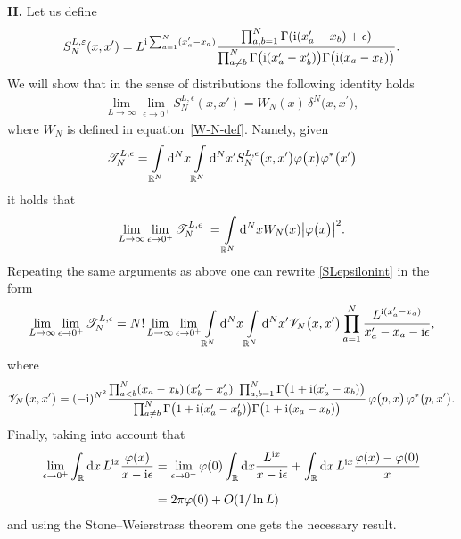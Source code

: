 \noindent
{\bf II.} Let us define
\begin{gather*}
S_N^{L,\varepsilon}(x,x')=L^{{\rm i}\sum_{a=1}^{N}(x'_a-x_a)}\frac{\prod_{a,b=1}^{N} \Gamma({\rm i}(x'_a-x_b)+\epsilon)}{\prod_{ a \not= b }^{ N }
\Gamma\big({\rm i} (x_{a}^{\prime}-x_{b}^{\prime}) \big) \Gamma\big({\rm i} (x_{a}-x_{b}) \big)}.
\end{gather*}
We will show that in the sense of distributions the following identity holds
\begin{gather*}
\lim_{L\rightarrow\infty}\lim_{\epsilon\rightarrow 0^+}S_N^{L,\epsilon}(x,x')
 =W_N(x) \, \delta^{N}\big(x,x^{\prime} \big),
\end{gather*}
where $W_N$ is defined in equation~\eqref{W-N-def}. Namely, given
\begin{gather}
\mathscr{T}_N^{L,\epsilon} = \int\limits_{\mathbb{R}^{N}}{\rm d}^{N}x
\int\limits_{\mathbb{R}^{N}}{} {\rm d}^{N}x^{\prime}
{S}_N^{L,\epsilon}\big(x,x^{\prime} \big)
\varphi\big(x\big)\varphi^{*}\big(x^{\prime}\big)
\label{SLepsilonint}
\end{gather}
it holds that
\begin{gather*}
\lim_{L\rightarrow\infty}\lim_{\epsilon \rightarrow 0^+ } \mathscr{T}_N^{L,\epsilon}   =
 \int\limits_{\mathbb{R}^{N}}{} {\rm d}^{N}x W_N(x) \big| \varphi\big(x\big) \big|^2 .
\end{gather*}
Repeating the same arguments as above one can rewrite \eqref{SLepsilonint} in the form
\begin{gather*}
\lim_{L\rightarrow\infty}\lim_{ \epsilon\rightarrow 0^+ } \mathscr{T}_N^{L,\epsilon} =
 N! \lim_{L\rightarrow\infty}\lim_{ \epsilon\rightarrow 0^+ }
 \int\limits_{\mathbb{R}^{N}}{} {\rm d}^{N}x
\int\limits_{\mathbb{R}^{N}}{} {\rm d}^{N}x^{\prime} \mathscr{V}_N \big(x,x^{\prime} \big)
\prod\limits_{a=1}^{N} \frac{ L^{{\rm i}(x'_a-x_a)} }{ x^{\prime}_a - x_a -{\rm i} \epsilon },
\end{gather*}
where
\begin{gather*}
\mathscr{V}_N\big(x,x^{\prime} \big) =(-{\rm i})^{N^2}
 \frac{ \prod_{a<b}^{N} (x_{a}-x_{b})\, (x_{b}^{\prime}-x_{a}^{\prime}) 
 \prod_{a,b=1}^{N}\Gamma\big(1+{\rm i}(x'_a-x_b)\big)}{\prod_{ a \not= b }^{ N }
\Gamma\big( 1+{\rm i} (x_{a}^{\prime}-x_{b}^{\prime}) \big) \Gamma\big( 1+{\rm i} (x_{a}-x_{b}) \big)}\,
\varphi\big(p,x\big) \, \varphi^{*}\big(p,x^{\prime}\big).
\end{gather*}
Finally, taking into account that
\begin{align*}
\lim_{\epsilon\rightarrow 0^+}\int_{\mathbb R} {\rm d}x\, L^{{\rm i}x}\frac{\varphi(x)}{x-{\rm i}\epsilon} & =
\lim_{\epsilon\rightarrow 0^+}\varphi(0)\int_{\mathbb R} {\rm d}x \frac{L^{{\rm i}x}}{x-{\rm i}\epsilon}
 + \int_{\mathbb R} {\rm d}x\, L^{{\rm i}x}\frac{\varphi(x)-\varphi(0)}{x}\notag
\\[2mm]
&=2\pi\varphi(0) + O(1/\ln L)
\end{align*}
and using the Stone--Weierstrass theorem one gets the necessary result.
